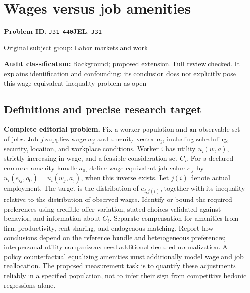 \documentclass[11pt,a4paper]{article}
\begin{document}
\section*{Wages versus job amenities}
\textbf{Problem ID:} \texttt{J31-440}\quad \textbf{JEL:} \texttt{J31}\par
\label{problem:OP-0355}
\label{audited:ECON-073}
{\sffamily\small\color{muted}Original subject group: Labor markets and work\par}
\label{definitions:problem:30007637}
\textbf{Audit classification:} Background; proposed extension. Full review checked. It explains identification and confounding; its conclusion does not explicitly pose this wage-equivalent inequality problem as open.
\subsection*{Definitions and precise research target}
\textbf{Complete editorial problem.} Fix a worker population and an observable set of jobs. Job \(j\) supplies wage \(w_j\) and amenity vector \(a_j\), including scheduling, security, location, and workplace conditions. Worker \(i\) has utility \(u_i(w,a)\), strictly increasing in wage, and a feasible consideration set \(C_i\). For a declared common amenity bundle \(a_0\), define wage-equivalent job value \(e_{ij}\) by \(u_i(e_{ij},a_0)=u_i(w_j,a_j)\), when this inverse exists. Let \(j(i)\) denote actual employment. The target is the distribution of \(e_{i,j(i)}\), together with its inequality relative to the distribution of observed wages. Identify or bound the required preferences using credible offer variation, stated choices validated against behavior, and information about \(C_i\). Separate compensation for amenities from firm productivity, rent sharing, and endogenous matching. Report how conclusions depend on the reference bundle and heterogeneous preferences; interpersonal utility comparisons need additional declared normalization. A policy counterfactual equalizing amenities must additionally model wage and job reallocation. The proposed measurement task is to quantify these adjustments reliably in a specified population, not to infer their sign from competitive hedonic regressions alone.
\end{document}
